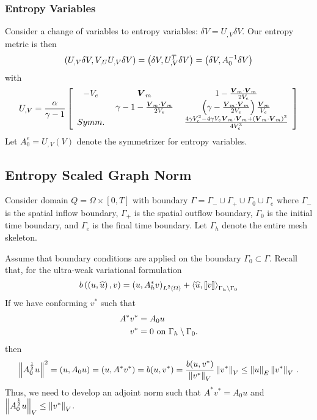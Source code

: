 \documentclass{article}
\begin{document}
\subsubsection*{Entropy Variables}
Consider a change of variables to entropy variables: $\delta V=U_{,V}\delta V$.
Our entropy metric is then
\[
\left( U_{,V}\delta V,V_{,U}U_{,V}\delta V \right)=\left( \delta V,U_{,V}^T\delta V \right)=\left( \delta V, A_0^{-1}\delta V \right)
\]
with 
\[
U_{,V}=\frac{\alpha}{\gamma-1}\left[ \begin{array}{ccc} -V_e\; & \boldsymbol V_m\; & 1-\frac{\boldsymbol V_m\cdot\boldsymbol V_m}{2V_e}\\ \; & \gamma-1-\frac{\boldsymbol V_m\cdot\boldsymbol V_m}{2V_e}\; & \left( \gamma-\frac{\boldsymbol V_m\cdot\boldsymbol V_m}{2V_e} \right)\frac{\boldsymbol V_m}{V_e}\\ Symm.\; & \; & \frac{4\gamma V_e^2-4\gamma V_e\boldsymbol V_m\cdot\boldsymbol V_m+\left( \boldsymbol V_m\cdot\boldsymbol V_m \right)^2}{4V_e^3}\\ \end{array} \right]
\]
Let $A_0^e=U_{,V}(V)$ denote the symmetrizer for entropy variables.

\subsection*{Entropy Scaled Graph Norm}
Consider domain $Q=\Omega\times[0,T]$ with boundary $\Gamma=\Gamma_-\cup\Gamma_+\cup\Gamma_0\cup\Gamma_e$ 
where $\Gamma_-$ is the spatial inflow boundary, $\Gamma_+$ is the spatial outflow boundary, $\Gamma_0$ is the initial time boundary, 
and $\Gamma_e$ is the final time boundary. Let $\Gamma_h$ denote the entire mesh skeleton.

Assume that boundary conditions are applied on the boundary $\Gamma_0\subset \Gamma$.  Recall that, for the ultra-weak variational formulation
\[
b\left( \left( u,\widehat{u} \right),v \right) = \left( u,A^*_h v \right)_{L^2\left( \Omega \right)} + \left\langle \widehat{u}, \left[ \![v]\! \right] \right\rangle_{\Gamma_h\setminus \Gamma_0}
\]
If we have conforming $v^*$ such that
\begin{align*}
A^* v^* &= A_0u\\
v^* &= 0 \text{ on } \Gamma_h\setminus\Gamma_0.
\end{align*}
then
\[
\left\| A_0^{\frac{1}{2}}u \right\|^2=\left( u,A_0u \right)=\left( u,A^* v^* \right)=b(u,v^*)=\frac{b(u,v^*)}{\left\| v^* \right\|_V}\left\| v^* \right\|_V\leq\left\| u \right\|_E\left\| v^* \right\|_V\,.
\]
Thus, we need to develop an adjoint norm such that $A^* v^*=A_0u$ and $\left\| A_0^{\frac{1}{2}}u \right\|_V\leq\left\| v^* \right\|_V$.
\end{document}
